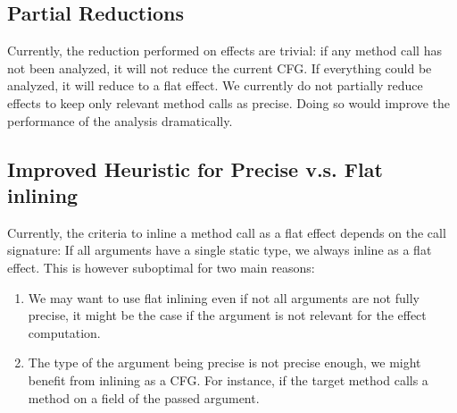 \documentclass[a4paper]{article}
\begin{document}
\subsection{Partial Reductions}
Currently, the reduction performed on effects are trivial: if any method call
has not been analyzed, it will not reduce the current CFG. If everything could
be analyzed, it will reduce to a flat effect. We currently do not partially
reduce effects to keep only relevant method calls as precise. Doing so would
improve the performance of the analysis dramatically.

\subsection{Improved Heuristic for Precise v.s. Flat inlining}
Currently, the criteria to inline a method call as a flat effect depends on the
call signature: If all arguments have a single static type, we always inline as
a flat effect. This is however suboptimal for two main reasons:
\begin{enumerate}
    \item We may want to use flat inlining even if not all arguments are not fully
precise, it might be the case if the argument is not relevant for the effect
computation.
    \item The type of the argument being precise is not precise enough, we might
benefit from inlining as a CFG. For instance, if the target method calls a
method on a field of the passed argument.
\end{enumerate}
\end{document}
